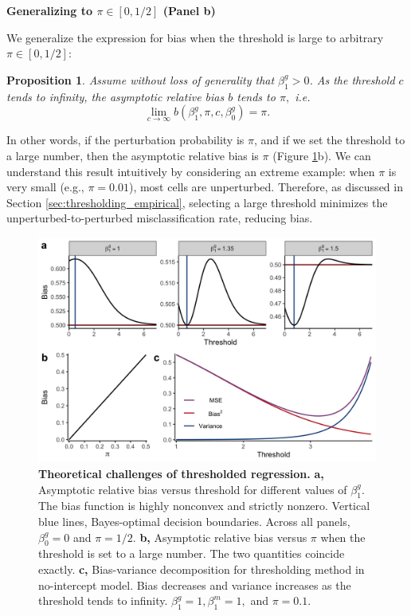 \documentclass[12pt]{article}
\newtheorem{proposition}{Proposition}
\begin{document}
\begin{center}
\textbf{Generalizing to $\pi \in [0,1/2]$ (Panel b)}
\end{center}
We generalize the expression for bias when the threshold is large to arbitrary $\pi \in [0,1/2]$:
\begin{proposition}\label{prop:c_limit}
Assume without loss of generality that $\beta^g_1 > 0$. As the threshold $c$ tends to infinity, the asymptotic relative bias $b$ tends to $\pi,$ i.e.
$$ \lim_{ c \to \infty } b(\beta^g_1, \pi, c, \beta^g_0) = \pi.$$
\end{proposition}
In other words, if the perturbation probability is $\pi$, and if we set the threshold to a large number, then the asymptotic relative bias is $\pi$ (Figure \ref{thresholding_theoretical}b). We can understand this result intuitively by considering an extreme example: when $\pi$ is very small (e.g., $\pi = 0.01$), most cells are unperturbed. Therefore, as discussed in Section \ref{sec:thresholding_empirical}, selecting a large threshold minimizes the unperturbed-to-perturbed misclassification rate, reducing bias. %

\begin{figure}[h!]
	\centering
	\includegraphics[width=1\linewidth]{../../figures/thresholding_theoretical/plot}
	\caption{\textbf{Theoretical challenges of thresholded regression.} \textbf{a,} Asymptotic relative bias versus threshold for different values of $\beta^g_1$. The bias function is highly nonconvex and strictly nonzero. Vertical blue lines, Bayes-optimal decision boundaries. Across all panels, $\beta^g_0 = 0$ and $\pi = 1/2$. \textbf{b,} Asymptotic relative bias versus $\pi$ when the threshold is set to a large number. The two quantities coincide exactly. \textbf{c,} Bias-variance decomposition for thresholding method in no-intercept model. Bias decreases and variance increases as the threshold tends to infinity. $\beta^g_1 = 1, \beta^m_1 = 1,$ and $\pi = 0.1$.}
	\label{thresholding_theoretical}
\end{figure}
\end{document}
